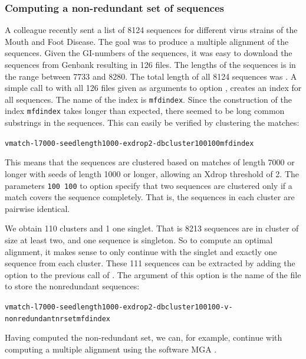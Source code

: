 \documentclass[12pt,titlepage]{article}
\makeatletter
\newcommand{\Seqfilename}[1]{\texttt{\small #1}\index{#1@\texttt{#1}}}
\newenvironment{Output}{%
\begin{scriptsize}
\begin{alltt}}{%
\end{alltt}
\end{scriptsize}%
\addvspace{-\medskipamount}
}
\makeatother
\begin{document}
\begin{AboutVmatch}
\subsubsection{Computing a non-redundant set of sequences}
A colleague recently sent a list of 8124 sequences for
different virus strains of the Mouth and Foot Disease.
The goal was to produce a multiple alignment of the sequences.
Given the GI-numbers of the sequences, it was easy to download
the sequences from Genbank resulting in 126 files. The lengths of the sequences
is in the range between 7733 and 8280. The total length of all
8124 sequences was .
A simple call to \MKV with all 126 files given as arguments to option 
, creates an index for all sequences. The name of the index is 
\Seqfilename{mfdindex}. Since the construction of the index
\Seqfilename{mfdindex} takes longer than expected, there 
seemed to be long common substrings in the sequences. This can
easily be verified by clustering the matches:

\begin{Output}
vmatch -l 7000 -seedlength 1000 -exdrop 2 -dbcluster 100 100 mfdindex
\end{Output}

This means that the sequences are clustered based on matches of length 
7000 or longer  with seeds of length 1000 or longer, allowing
an Xdrop threshold of 2. The parameters
\texttt{100 100} to option 
specify that two sequences are clustered only if
a match covers the sequence completely. That is, the
sequences in each cluster are pairwise identical.

We obtain 110 clusters and 1 one singlet. That is 8213 sequences are
in cluster of size at least two, and one sequence is singleton.
So to compute an optimal alignment, it makes sense to only continue
with the singlet and exactly one sequence from each cluster. 
These 111 sequences can be extracted by adding the option
 to the previous call of \VM. The argument 
of this option is the name of the file to store the nonredundant 
sequences:

\begin{Output}
vmatch -l 7000 -seedlength 1000 -exdrop 2 -dbcluster 100 100 -v -nonredundant nrset mfdindex
\end{Output}

Having computed the non-redundant set, we can, for example, continue with 
computing a multiple alignment using the software MGA 
\cite{HOEH:KUR:OHL:2002}.


\end{AboutVmatch}
\end{document}
